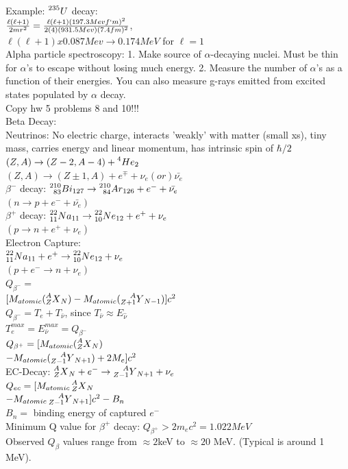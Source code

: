 \documentclass{article}
\begin{document}
\begin{multicols}{3}
Example: $\prescript{235}{}{U}$ decay:\\
 $\frac{\ell(\ell+1)}{2mr^{2}} = \frac{\ell(\ell+1)(197.3Mev f`m)^{2}}{2(4)(931.5Mev)(7.4fm)^{2}}$,\\ $\ell(\ell+1)x0.087Mev \rightarrow 0.174MeV$ for $\ell = 1$\\
 Alpha particle spectroscopy: 1. Make source of $\alpha$-decaying nuclei.  Must be thin for $\alpha$'s to escape without losing much energy.  2. Measure the number of $\alpha$'s as a function of their energies.  You can also measure g-rays emitted from excited states populated by $\alpha$ decay.\\

Copy hw 5 problems 8 and 10!!!\\

Beta Decay:\\
Neutrinos: No electric charge, interacts 'weakly' with matter (small xs), tiny mass, carries energy and linear momentum, has intrinsic spin of $\hbar /2$\\
$(Z,A) \rightarrow (Z-2,A-4) + \prescript{4}{}{He}_{2}$\\
$(Z,A) \rightarrow (Z\pm 1, A) + e^{\mp} + \nu_{e} (or) \bar{\nu_{e}}$\\
$\beta^{-}$ decay: $\prescript{210}{83}{Bi}_{127} \rightarrow \prescript{210}{84}{Ar}_{126} + e^{-} + \bar{\nu_{e}}$\\
$(n\rightarrow p + e^{-} + \bar{\nu_{e}})$\\
$\beta^{+}$ decay: $\prescript{22}{11}{Na}_{11} \rightarrow \prescript{22}{10}{Ne}_{12} + e^{+} + \nu_{e}$\\
$(p\rightarrow n + e^{+} + \nu_{e})$\\
Electron Capture:\\
$\prescript{22}{11}{Na}_{11} + e^{+} \rightarrow \prescript{22}{10}{Ne}_{12} + \nu_{e}$\\
$(p + e^{-}\rightarrow n + \nu_{e})$\\
$Q_{\beta^{-}} = $\\$[M_{atomic}(\prescript{A}{Z}{X}_{N})-M_{atomic}(\prescript{A}{Z+1}{Y}_{N-1})]c^{2}$\\
$Q_{\beta^{-}} = T_{e} + T_{\bar{\nu}}$, since $T_{\bar{\nu}} \approx E_{\hat{\nu}}$\\
$T_{e}^{max} = E_{\bar{\nu}}^{max} = Q_{\beta^{-}}$\\
$Q_{\beta^{+}} = [M_{atomic}(\prescript{A}{Z}{X}_{N})$\\$ - M_{atomic}(\prescript{A}{Z-1}{Y}_{N+1}) + 2M_{e}]c^{2}$\\
EC-Decay: $\prescript{A}{Z}{X}_{N} + e^{-} \rightarrow \prescript{A}{Z-1}{Y}_{N+1} + \nu_{e}$\\
$Q_{ec} = [M_{atomic}\prescript{A}{Z}{X}_{N} $\\$ - M_{atomic}\prescript{A}{Z-1}{Y}_{N+1}]c^{2} - B_{n}$\\
$B_{n} = $ binding energy of captured $e^{-}$\\
Minimum Q value for $\beta^{+}$ decay: $Q_{\beta^{+}} > 2m_{e}c^2 = 1.022MeV$\\
Observed $Q_{\beta}$ values range from $\approx 2$keV to $\approx 20$ MeV. (Typical is around 1 MeV). 


\end{multicols}
\end{document}
